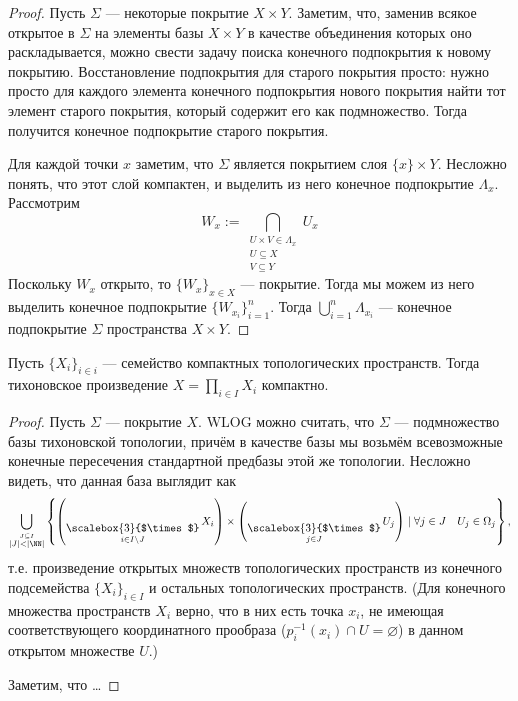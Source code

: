 \documentclass[12pt,a4paper]{article}
\DeclareMathOperator*{\bigtimes}{\text{\raisebox{-6pt}{\scalebox{3}{$\times$}}}}
\begin{document}
    \begin{proof}
        Пусть $\Sigma$ --- некоторые покрытие $X \times Y$. Заметим, что, заменив всякое открытое в $\Sigma$ на элементы базы $X \times Y$ в качестве объединения которых оно раскладывается, можно свести задачу поиска конечного подпокрытия к новому покрытию. Восстановление подпокрытия для старого покрытия просто: нужно просто для каждого элемента конечного подпокрытия нового покрытия найти тот элемент старого покрытия, который содержит его как подмножество. Тогда получится конечное подпокрытие старого покрытия.

        Для каждой точки $x$ заметим, что $\Sigma$ является покрытием слоя $\{x\} \times Y$. Несложно понять, что этот слой компактен, и выделить из него конечное подпокрытие $\Lambda_x$. Рассмотрим
        \[W_x := \bigcap_{\substack{U \times V \in \Lambda_x\\U \subseteq X\\V \subseteq Y}} U_x\]
        Поскольку $W_x$ открыто, то $\{W_x\}_{x \in X}$ --- покрытие. Тогда мы можем из него выделить конечное подпокрытие $\{W_{x_i}\}_{i = 1}^n$. Тогда $\bigcup_{i=1}^n \Lambda_{x_i}$ --- конечное подпокрытие $\Sigma$ пространства $X \times Y$.
    \end{proof}

    \begin{theorem}[Тихонова]
        Пусть $\{X_i\}_{i \in i}$ --- семейство компактных топологических пространств. Тогда тихоновское произведение $X = \prod_{i \in I} X_i$ компактно.
    \end{theorem}

    \begin{proof}
        Пусть $\Sigma$ --- покрытие $X$. WLOG можно считать, что $\Sigma$ --- подмножество базы тихоновской топологии, причём в качестве базы мы возьмём всевозможные конечные пересечения стандартной предбазы этой же топологии. Несложно видеть, что данная база выглядит как
        \[\bigcup_{\stackrel{J \subseteq I}{|J| < |\NN|}} \left\{\left(\bigtimes_{i \in I \setminus J} X_i\right) \times \left(\bigtimes_{j \in J} U_j\right) \mid \forall j \in J\quad U_j \in \Omega_j\right\},\]
        т.е. произведение открытых множеств топологических пространств из конечного подсемейства $\{X_i\}_{i \in I}$ и остальных топологических пространств. (Для конечного множества пространств $X_i$ верно, что в них есть точка $x_i$, не имеющая соответствующего координатного прообраза ($p_i^{-1}(x_i) \cap U = \varnothing$) в данном открытом множестве $U$.)

        Заметим, что \dots
    \end{proof}
\end{document}
